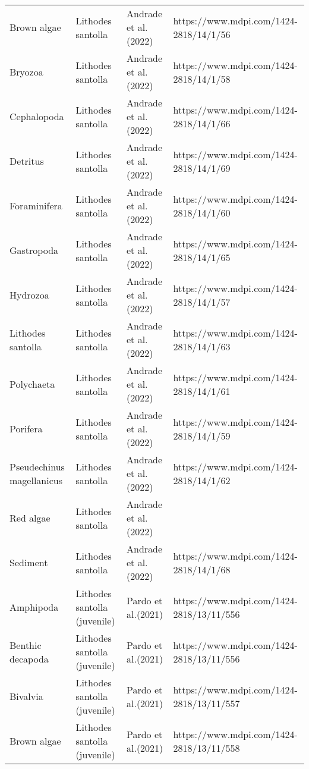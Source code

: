 \documentclass[
]{article}
\begin{document}
\begin{landscape}
\begin{longtable}[t]{>{\raggedright\arraybackslash}p{4cm}>{\centering\arraybackslash}p{4cm}>{\centering\arraybackslash}p{6cm}>{\centering\arraybackslash}p{6cm}}
Brown algae & Lithodes santolla & \tiny Andrade et al. (2022) & \tiny https://www.mdpi.com/1424-2818/14/1/56\\
Bryozoa & Lithodes santolla & \tiny Andrade et al. (2022) & \tiny https://www.mdpi.com/1424-2818/14/1/58\\
Cephalopoda & Lithodes santolla & \tiny Andrade et al. (2022) & \tiny https://www.mdpi.com/1424-2818/14/1/66\\
Detritus & Lithodes santolla & \tiny Andrade et al. (2022) & \tiny https://www.mdpi.com/1424-2818/14/1/69\\
\addlinespace
Foraminifera & Lithodes santolla & \tiny Andrade et al. (2022) & \tiny https://www.mdpi.com/1424-2818/14/1/60\\
Gastropoda & Lithodes santolla & \tiny Andrade et al. (2022) & \tiny https://www.mdpi.com/1424-2818/14/1/65\\
Hydrozoa & Lithodes santolla & \tiny Andrade et al. (2022) & \tiny https://www.mdpi.com/1424-2818/14/1/57\\
Lithodes santolla & Lithodes santolla & \tiny Andrade et al. (2022) & \tiny https://www.mdpi.com/1424-2818/14/1/63\\
Polychaeta & Lithodes santolla & \tiny Andrade et al. (2022) & \tiny https://www.mdpi.com/1424-2818/14/1/61\\
\addlinespace
Porifera & Lithodes santolla & \tiny Andrade et al. (2022) & \tiny https://www.mdpi.com/1424-2818/14/1/59\\
Pseudechinus magellanicus & Lithodes santolla & \tiny Andrade et al. (2022) & \tiny https://www.mdpi.com/1424-2818/14/1/62\\
Red algae & Lithodes santolla & \tiny Andrade et al. (2022) & \tiny\\
Sediment & Lithodes santolla & \tiny Andrade et al. (2022) & \tiny https://www.mdpi.com/1424-2818/14/1/68\\
Amphipoda & Lithodes santolla (juvenile) & \tiny Pardo et al.(2021) & \tiny https://www.mdpi.com/1424-2818/13/11/556\\
\addlinespace
Benthic decapoda & Lithodes santolla (juvenile) & \tiny Pardo et al.(2021) & \tiny https://www.mdpi.com/1424-2818/13/11/556\\
Bivalvia & Lithodes santolla (juvenile) & \tiny Pardo et al.(2021) & \tiny https://www.mdpi.com/1424-2818/13/11/557\\
Brown algae & Lithodes santolla (juvenile) & \tiny Pardo et al.(2021) & \tiny https://www.mdpi.com/1424-2818/13/11/558\\

\end{longtable}
\end{landscape}
\end{document}
